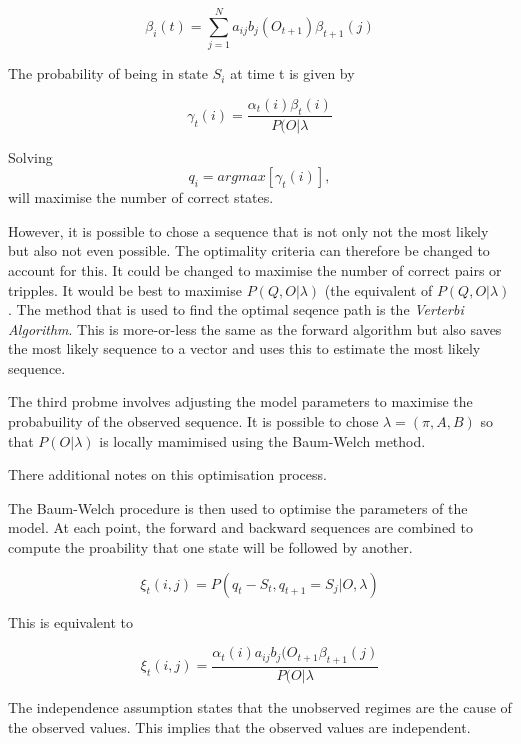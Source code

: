 \documentclass[12pt, a4paper, oneside]{article} %
\begin{document}
\begin{equation} 
\beta_i(t) = \sum_{j = 1}^N a_{ij}b_j(O_{t+1})\beta_{t+1}(j)
\end{equation}

The probability of being in state $S_i$ at time t is given by 

\begin{equation}
\gamma_t(i) = \frac{\alpha_t(i)\beta_t(i)}{P(O|\lambda}
\end{equation}

Solving
\begin{equation}
q_i = argmax [\gamma_t(i)], %
\end{equation}
will maximise the number of correct states. 

However, it is possible to chose a sequence that is not only not the most likely but also not even possible.  The optimality criteria can therefore be changed to account for this.  It could be changed to maximise the number of correct pairs or tripples. It would be best to maximise $P(Q, O |\lambda)$ (the equivalent of $P(Q, O| \lambda)$.  The method that is used to find the optimal seqence path is the \emph{Verterbi Algorithm}.  This is more-or-less the same as the forward algorithm but also saves the most likely sequence to a vector and uses this to estimate the most likely sequence. 

The third probme involves adjusting the model parameters to maximise the probabuility of the observed sequence. It is possible to chose $\lambda = (\pi, A, B)$ so that $P(O|\lambda)$ is locally mamimised using the Baum-Welch method. 

There additional notes on this optimisation process. 

The Baum-Welch procedure is then used to optimise the parameters of the model.  At each point, the forward and backward sequences are combined to compute the proability that one state will be followed by another. 

\begin{equation}
\xi_t(i,j) = P(q_t - S_t, q_{t+1} = S_j| O, \lambda)
\end{equation}

This is equivalent to 

\begin{equation}
\xi_t(i,j) = \frac{\alpha_t(i)a_{ij}b_j(O_{t+1}\beta_{t+1}(j)}{P(O|\lambda}
\end{equation}

The independence assumption states that the unobserved regimes are the cause of the observed values.  This implies that the observed values are independent. 
\end{document}
